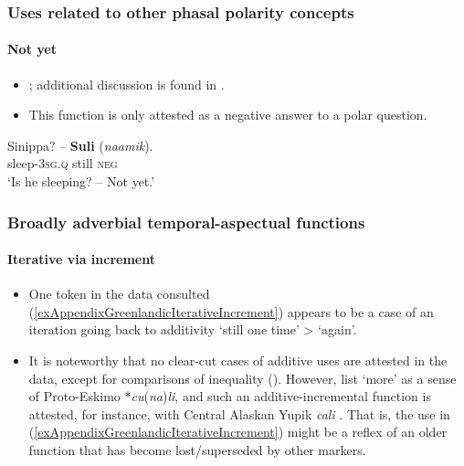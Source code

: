 \subsubsection{Uses related to other phasal polarity concepts}
\paragraph{Not yet}\label{appendixGreenlandicNotYet}
\begin{itemize}
	\item \textcite[23–24]{Fortescue1984}; additional discussion is found in \textcite[294]{vanBaar1997}.
	\item This function is only attested as a negative answer to a polar question.
\end{itemize}

\begin{exe}
	\ex
	\gll Sinippa? – \textbf{Suli} (\textit{naamik}).\\
	sleep-3\textsc{sg}.\textsc{q} {} still \phantom{(}\textsc{neg}\\
	\glt \lq Is he sleeping? -- Not yet.' \parencite[24]{Fortescue1984}
\end{exe}

\subsubsection{Broadly adverbial temporal-aspectual functions}
\paragraph{Iterative via increment}
\label{appendixGreenlandicIterativeIncrement}
\begin{itemize}
	\item One token in the data consulted (\ref{exAppendixGreenlandicIterativeIncrement}) appears to be a case of an iteration going back to additivity \lq still one time\rq{} > \lq again\rq{}. 
	\item It is noteworthy that no clear-cut cases of additive uses are attested in the data, except for comparisons of inequality (). However, \textcite[90]{FortescueEtAl1984} list \lq more' as a sense of Proto-Eskimo \mbox{*\textit{cu}(\textit{na})\textit{li}}, and such an additive-incremental function is attested, for instance, with Central Alaskan Yupik \textit{cali}  \parencite{Miyaoka2012}. That is, the use in (\ref{exAppendixGreenlandicIterativeIncrement}) might be a reflex of an older function that has become lost/superseded by other markers.
\end{itemize}

